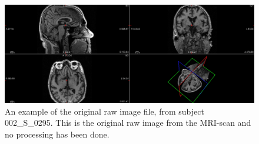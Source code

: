 \documentclass[12pt, fleqn, titlepage]{article}
\begin{document}
\begin{figure}[H]
	\centering
	\includegraphics[width=0.95\linewidth]{mymans2}
	\caption{An example of the original raw image file, from subject 002\_S\_0295. This is the original raw image from the MRI-scan and no processing has been done.}
	\label{fig:screenshot001}
\end{figure}





\end{document}
